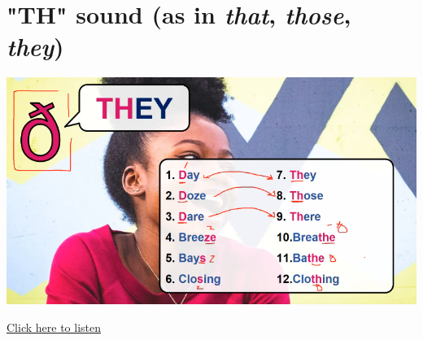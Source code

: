 \section{"TH" sound  (as in \textit{that}, \textit{those}, \textit{they})}
\begin{center}
\includegraphics[width=1\textwidth]{images/voiced_th_portrait.png}
\end{center}

\href{https://drive.google.com/file/d/1XmUZs4md19kMjeZFluzftm0_2KcIrsU3/view?usp=drive_link}{Click here to listen}

